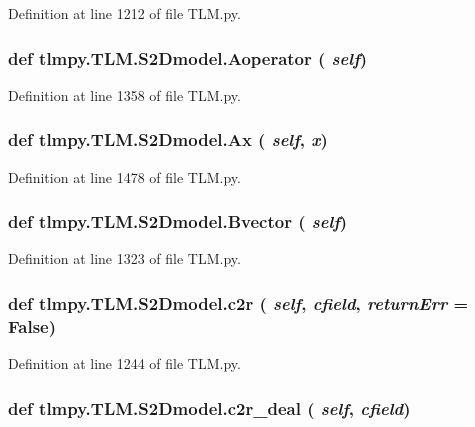 Definition at line 1212 of file TLM.py.\hypertarget{classtlmpy_1_1TLM_1_1S2Dmodel_ad577d43e960109dc295739e8fdeba6b2}{
\subsubsection[{Aoperator}]{\setlength{\rightskip}{0pt plus 5cm}def tlmpy.TLM.S2Dmodel.Aoperator ( {\em self})}}
\label{classtlmpy_1_1TLM_1_1S2Dmodel_ad577d43e960109dc295739e8fdeba6b2}


Definition at line 1358 of file TLM.py.\hypertarget{classtlmpy_1_1TLM_1_1S2Dmodel_a208260fd15a085c4aab1f0d63f307c02}{
\subsubsection[{Ax}]{\setlength{\rightskip}{0pt plus 5cm}def tlmpy.TLM.S2Dmodel.Ax ( {\em self}, \/   {\em x})}}
\label{classtlmpy_1_1TLM_1_1S2Dmodel_a208260fd15a085c4aab1f0d63f307c02}


Definition at line 1478 of file TLM.py.\hypertarget{classtlmpy_1_1TLM_1_1S2Dmodel_ac5d234aa086c273d1cd4f840a0524811}{
\subsubsection[{Bvector}]{\setlength{\rightskip}{0pt plus 5cm}def tlmpy.TLM.S2Dmodel.Bvector ( {\em self})}}
\label{classtlmpy_1_1TLM_1_1S2Dmodel_ac5d234aa086c273d1cd4f840a0524811}


Definition at line 1323 of file TLM.py.\hypertarget{classtlmpy_1_1TLM_1_1S2Dmodel_a9c0cce5902ee122410fb05c90e573f61}{
\subsubsection[{c2r}]{\setlength{\rightskip}{0pt plus 5cm}def tlmpy.TLM.S2Dmodel.c2r ( {\em self}, \/   {\em cfield}, \/   {\em returnErr} = {\ttfamily False})}}
\label{classtlmpy_1_1TLM_1_1S2Dmodel_a9c0cce5902ee122410fb05c90e573f61}


Definition at line 1244 of file TLM.py.\hypertarget{classtlmpy_1_1TLM_1_1S2Dmodel_add6abb2a553bdc8b9a7754d226d3f53c}{
\subsubsection[{c2r\_\-deal}]{\setlength{\rightskip}{0pt plus 5cm}def tlmpy.TLM.S2Dmodel.c2r\_\-deal ( {\em self}, \/   {\em cfield})}}
\label{classtlmpy_1_1TLM_1_1S2Dmodel_add6abb2a553bdc8b9a7754d226d3f53c}


